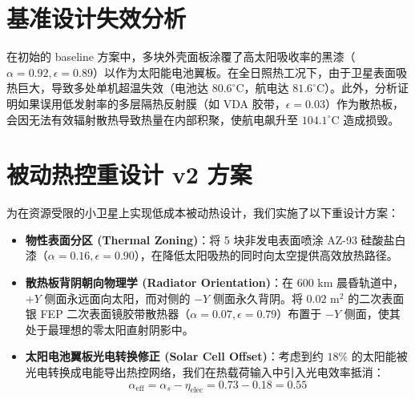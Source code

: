 \documentclass[UTF8,11pt,a4paper]{ctexart}
\begin{document}
\begin{table}[H]
\centering
\caption{材料物理参数与太阳吸收率/红外发射率（引自 NASA 官方数据）}
\vspace{0.2cm}
\end{table}

\section{基准设计失效分析}
在初始的 baseline 方案中，多块外壳面板涂覆了高太阳吸收率的黑漆（$\alpha = 0.92, \epsilon = 0.89$）以作为太阳能电池翼板。在全日照热工况下，由于卫星表面吸热巨大，导致多处单机超温失效（电池达 $80.6^\circ$C，航电达 $81.6^\circ$C）。此外，分析证明如果误用低发射率的多层隔热反射膜（如 VDA 胶带，$\epsilon = 0.03$）作为散热板，会因无法有效辐射散热导致热量在内部积聚，使航电飙升至 $104.1^\circ$C 造成损毁。

\section{被动热控重设计 v2 方案}
为在资源受限的小卫星上实现低成本被动热设计，我们实施了以下重设计方案：
\begin{itemize}
    \item \textbf{物性表面分区 (Thermal Zoning)}：将 5 块非发电表面喷涂 AZ-93 硅酸盐白漆（$\alpha=0.16, \epsilon=0.90$），在降低太阳吸热的同时向太空提供高效放热路径。
    \item \textbf{散热板背阴朝向物理学 (Radiator Orientation)}：在 600 km 晨昏轨道中，$+Y$ 侧面永远面向太阳，而对侧的 $-Y$ 侧面永久背阴。将 $0.02\text{ m}^2$ 的二次表面银 FEP 二次表面镜胶带散热器（$\alpha=0.07, \epsilon=0.79$）布置于 $-Y$ 侧面，使其处于最理想的零太阳直射阴影中。
    \item \textbf{太阳电池翼板光电转换修正 (Solar Cell Offset)}：考虑到约 $18\%$ 的太阳能被光电转换成电能导出热控网络，我们在热载荷输入中引入光电效率抵消：
    \begin{equation}
        \alpha_{\text{eff}} = \alpha_s - \eta_{\text{elec}} = 0.73 - 0.18 = 0.55
    \end{equation}
\end{itemize}
\end{document}

